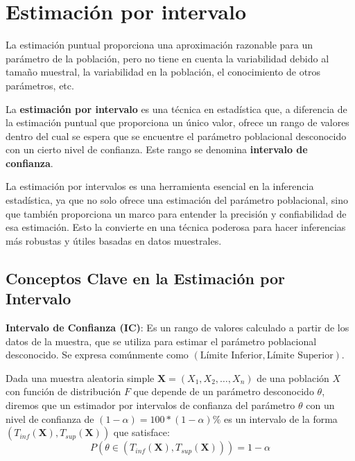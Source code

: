 \documentclass[
  letterpaper,
  DIV=11,
  numbers=noendperiod]{scrreprt}
\begin{document}
\hypertarget{estimaciuxf3n-por-intervalo-1}{%
\section{Estimación por intervalo}\label{estimaciuxf3n-por-intervalo-1}}

La estimación puntual proporciona una aproximación razonable para un
parámetro de la población, pero no tiene en cuenta la variabilidad
debido al tamaño muestral, la variabilidad en la población, el
conocimiento de otros parámetros, etc.

La \textbf{estimación por intervalo} es una técnica en estadística que,
a diferencia de la estimación puntual que proporciona un único valor,
ofrece un rango de valores dentro del cual se espera que se encuentre el
parámetro poblacional desconocido con un cierto nivel de confianza. Este
rango se denomina \textbf{intervalo de confianza}.

La estimación por intervalos es una herramienta esencial en la
inferencia estadística, ya que no solo ofrece una estimación del
parámetro poblacional, sino que también proporciona un marco para
entender la precisión y confiabilidad de esa estimación. Esto la
convierte en una técnica poderosa para hacer inferencias más robustas y
útiles basadas en datos muestrales.

\hypertarget{conceptos-clave-en-la-estimaciuxf3n-por-intervalo}{%
\subsection{Conceptos Clave en la Estimación por
Intervalo}\label{conceptos-clave-en-la-estimaciuxf3n-por-intervalo}}

\textbf{Intervalo de Confianza (IC)}: Es un rango de valores calculado a
partir de los datos de la muestra, que se utiliza para estimar el
parámetro poblacional desconocido. Se expresa comúnmente como
\((\text{Límite Inferior}, \text{Límite Superior})\).

Dada una muestra aleatoria simple \(\mathbf{X}=(X_1,X_2,\ldots,X_n)\) de
una población \(X\) con función de distribución \(F\) que depende de un
parámetro desconocido \(\theta\), diremos que un estimador por
intervalos de confianza del parámetro \(\theta\) con un nivel de
confianza de \((1-\alpha)=100*(1-\alpha)\%\) es un intervalo de la forma
\((T_{inf}(\mathbf{X}),T_{sup}(\mathbf{X}))\) que satisface:
\[P(\theta \in (T_{inf}(\mathbf{X}),T_{sup}(\mathbf{X})))=1-\alpha\]
\end{document}
